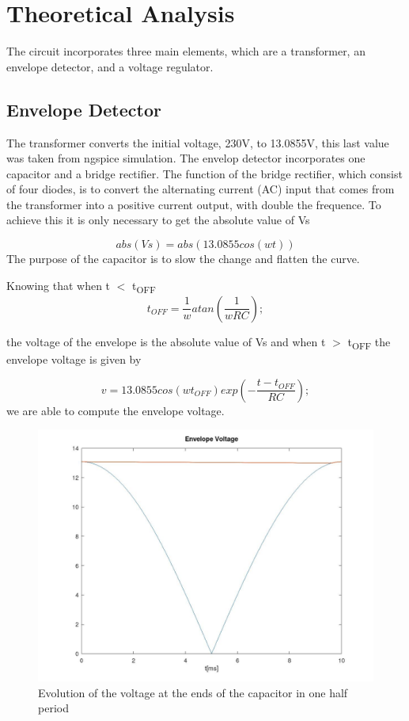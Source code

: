 \newpage
\section{Theoretical Analysis}
The circuit incorporates three main elements, which are a transformer, an envelope detector, and a voltage regulator.

\subsection{Envelope Detector}
The transformer converts the initial voltage, 230V, to 13.0855V, this last value was taken from ngspice simulation.
The envelop detector incorporates one capacitor and a bridge rectifier.
The function of the bridge rectifier, which consist of four diodes, is to convert the alternating current (AC) input
 that comes from the transformer into a positive current output, with double the frequence. To achieve this it is only necessary to get the absolute value of Vs

\begin{equation}
abs(Vs) = abs(13.0855cos(wt))
\end{equation}
The purpose of the capacitor is to slow the change and flatten the curve.

Knowing that when t $<$ t\textsubscript{OFF}
\begin{equation}
t_{OFF} = \frac{1}{w}atan(\frac{1}{wRC});
\end{equation}

the voltage of the envelope is the absolute value of Vs and when t $>$ t\textsubscript{OFF} the envelope voltage is given by

\begin{equation}
v = 13.0855cos(wt_{OFF})exp(-\frac{t-t_{OFF}}{RC});
\end{equation}
we are able to compute the envelope voltage.


\vspace{-4mm}
\begin{figure}[h] 
    \centering
    \includegraphics[width=0.75\linewidth]{../mat/venvelope.jpg}
    \caption{Evolution of the voltage at the ends of the capacitor in one half period}
    \label{fig:Envelope Detector}
\end{figure}

